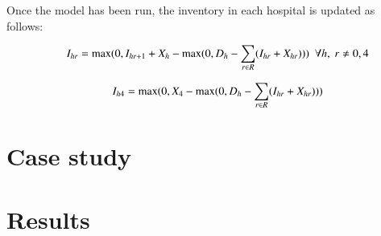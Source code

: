 \documentclass{elsarticle}
\begin{document}
Once the model has been run, the inventory in each hospital is updated as follows:

	\begin{equation}
	\begin{array}{ll@{}ll}
	& \displaystyle I_{hr} = \max(0, I_{hr+1} + X_{h} - \max(0,D_{h}- \sum\limits_{r \in R}(I_{hr} + X_{hr}))) \ \ \forall h, \ r \neq 0 , 4 \\
	\end{array}
	\label{eq:Eq32}
	\end{equation}	

	
	\begin{equation}
	\begin{array}{ll@{}ll}
	& \displaystyle I_{h4} = \max(0, X_{4} - \max(0,D_{h}- \sum\limits_{r \in R}(I_{hr} + X_{hr})))\\
	\end{array}
	\label{eq:Eq32}
	\end{equation}	

\section{Case study}

\section{Results}


\end{document}

